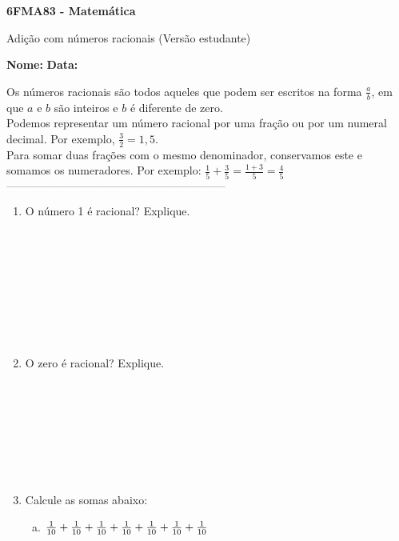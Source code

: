 \documentclass[a4paper,14pt]{article}
\begin{document}
	
	\noindent\textbf{6FMA83 - Matemática} 
	
	\begin{center}Adição com números racionais (Versão estudante)
	\end{center}
	
	\noindent\textbf{Nome:} \underline{\hspace{10cm}}
	\noindent\textbf{Data:} \underline{\hspace{4cm}}
	
	
	\begin{multicols}{2}
		\noindent Os números racionais são todos aqueles que podem ser escritos na forma $\frac{a}{b}$, em que $a$ e $b$ são inteiros e $b$ é diferente de zero. \\
		Podemos representar um número racional por uma fração ou por um numeral decimal. Por exemplo, $\frac{3}{2} = 1,5$. \\
		Para somar duas frações com o mesmo denominador, conservamos este e somamos os numeradores. Por exemplo: $\frac{1}{5} + \frac{3}{5} = \frac{1 + 3}{5} = \frac{4}{5}$ \\
		\noindent\textsubscript{-----------------------------------------------------------------------}
		\begin{enumerate} 
			\item O número 1 é racional? Explique. \\\\\\\\\\\\\\\\\\
			\item O zero é racional? Explique. \\\\\\\\\\\\\\\\
			\item Calcule as somas abaixo:
			\noindent\begin{enumerate}[a)]
				\item $\frac{1}{10} + \frac{1}{10} + \frac{1}{10} + \frac{1}{10} + \\\\ \frac{1}{10} + \frac{1}{10} + \frac{1}{10}$ \\\\\\\\\\\\\\\\\\

\end{enumerate}
\end{enumerate}
\end{multicols}
\end{document}
